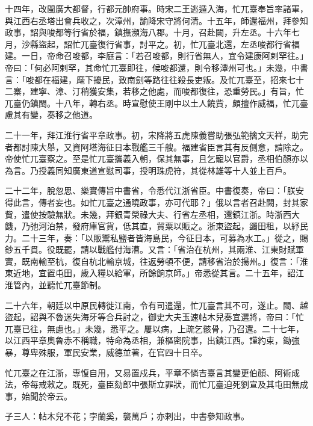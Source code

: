 \begin{pinyinscope}
 十四年，改閩廣大都督，行都元帥府事。時宋二王逃遁入海，忙兀臺奉旨率諸軍，與江西右丞塔出會兵收之，次漳州，諭降宋守將何清。十五年，師還福州，拜參知政事，詔與唆都等行省於福，鎮撫瀕海八郡。十月，召赴闕，升左丞。十六年七月，沙縣盜起，詔忙兀臺復行省事，討平之。初，忙兀臺北還，左丞唆都行省福建。一日，帝命召唆都，李庭言：「若召唆都，則行省無人，宜令建康阿剌罕往。」帝曰：「何必阿剌罕，其命忙兀臺即往，候唆都還，則令移潭州可也。」未幾，中書言：「唆都在福建，麾下擾民，致南劍等路往往殺長吏叛。及忙兀臺至，招來七十二寨，建寧、漳、汀稍獲安集，若移之他處，而唆都復往，恐重勞民。」有旨，忙兀臺仍鎮閩。十八年，轉右丞。時宣慰使王剛中以土人饒貲，頗擅作威福，忙兀臺慮其有變，奏移之他道。



 二十一年，拜江淮行省平章政事。初，宋降將五虎陳義嘗助張弘範擒文天祥，助完者都討陳大舉，又資阿塔海征日本戰艦三千艘。福建省臣言其有反側意，請除之。帝使忙兀臺察之。至是忙兀臺攜義入朝，保其無事，且乞寵以官爵，丞相伯顏亦以為言。乃授義同知廣東道宣慰司事，授明珠虎符，其從林雄等十人並上百戶。



 二十二年，脫忽思、樂實傳旨中書省，令悉代江浙省臣。中書復奏，帝曰：「朕安得此言，傳者妄也。如忙兀臺之通曉政事，亦可代耶？」俄以言者召赴闕，封其家貲，遣使按驗無狀。未幾，拜銀青榮祿大夫、行省左丞相，還鎮江浙。時浙西大饑，乃弛河泊禁，發府庫官貨，低其直，貿粟以賑之。浙東盜起，蠲田租，以紓民力。二十三年，奏：「以販鬻私鹽者皆海島民，今征日本，可募為水工。」從之，賜鈔五千貫。役既罷，請以戰艦付海漕。又言：「省治在杭州，其兩淮、江東財賦軍實，既南輸至杭，復自杭北輸京城，往返勞頓不便，請移省治於揚州。」復言：「淮東近地，宜置屯田，歲入糧以給軍，所餘餉京師。」帝悉從其言。二十五年，詔江淮管內，並聽忙兀臺節制。



 二十六年，朝廷以中原民轉徙江南，令有司遣還，忙兀臺言其不可，遂止。閩、越盜起，詔與不魯迷失海牙等合兵討之，御史大夫玉速帖木兒奏宜選將，帝曰：「忙兀臺已往，無慮也。」未幾，悉平之。屢以病，上疏乞骸骨，乃召還。二十七年，以江西平章奧魯赤不稱職，特命為丞相，兼樞密院事，出鎮江西。謹約束，鋤強暴，尊卑殊服，軍民安業，威德並著，在官四十日卒。



 忙兀臺之在江浙，專愎自用，又易置戍兵，平章不憐吉臺言其變更伯顏、阿術成法，帝每戒敕之。既死，臺臣劾郎中張斯立罪狀，而忙兀臺迫死劉宣及其屯田無成事，始聞於帝云。



 子三人：帖木兒不花；孛蘭奚，襲萬戶；亦剌出，中書參知政事。




\end{pinyinscope}
